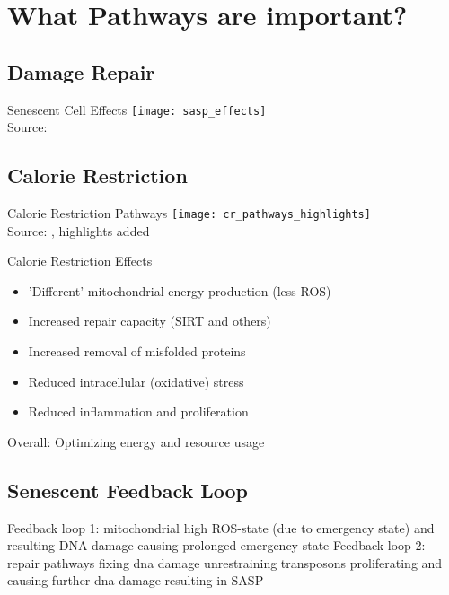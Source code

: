 \section{What Pathways are important?}

\subsection{Damage Repair}
\begin{frame}[c]{Senescent Cell Effects}
    \texttt{[image: sasp\_effects]} \\
    Source: \cite{malaquin2016keeping}
\end{frame}




\subsection{Calorie Restriction}

\begin{frame}[c]{Calorie Restriction Pathways}
    \texttt{[image: cr\_pathways\_highlights]} \\
    Source: \cite{hanjani2018protein}, highlights added
\end{frame}


\begin{frame}[c]{Calorie Restriction Effects}
    \large
    \begin{itemize}[<+(1)->]
        \item 'Different' mitochondrial energy production (less ROS)
        \item Increased repair capacity (SIRT and others)
        \item Increased removal of misfolded proteins
        \item Reduced intracellular (oxidative) stress
        \item Reduced inflammation and proliferation
    \end{itemize}
    Overall: Optimizing energy and resource usage
\end{frame}


\subsection{Senescent Feedback Loop}

\begin{frame}[c]
    Feedback loop 1: mitochondrial high ROS-state (due to emergency state) and resulting DNA-damage causing prolonged emergency state
    Feedback loop 2: repair pathways fixing dna damage unrestraining transposons proliferating and causing further dna damage
    resulting in SASP
\end{frame}
